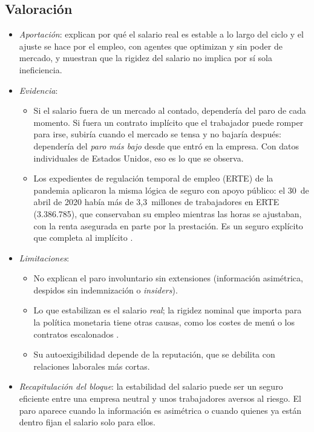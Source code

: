 \documentclass[11pt]{article}
\begin{document}
\subsection{Valoración}\label{sec:contratos-implicitos-valoracion}

\begin{itemize}
\item \emph{Aportación}: explican por qué el salario real es estable a lo largo del ciclo y el ajuste se hace por el empleo, con agentes que optimizan y sin poder de mercado, y muestran que la rigidez del salario no implica por sí sola ineficiencia.
\item \emph{Evidencia}:
  \begin{itemize}
  \item Si el salario fuera de un mercado al contado, dependería del paro de cada momento. Si fuera un contrato implícito que el trabajador puede romper para irse, subiría cuando el mercado se tensa y no bajaría después: dependería del \emph{paro más bajo} desde que entró en la empresa. Con datos individuales de Estados Unidos, eso es lo que se observa\nocite{BeaudryDiNardo1991Effect}.
  \item Los expedientes de regulación temporal de empleo (ERTE) de la pandemia aplicaron la misma lógica de seguro con apoyo público: el 30~de abril de 2020 había más de 3,3~millones de trabajadores en ERTE (3.386.785), que conservaban su empleo mientras las horas se ajustaban, con la renta asegurada en parte por la prestación\nocite{MISSM2020Afiliacion}. Es un seguro explícito que completa al implícito .
  \end{itemize}
\item \emph{Limitaciones}:
  \begin{itemize}
  \item No explican el paro involuntario sin extensiones (información asimétrica, despidos sin indemnización o \emph{insiders}).
  \item Lo que estabilizan es el salario \emph{real}; la rigidez nominal que importa para la política monetaria tiene otras causas, como los costes de menú o los contratos escalonados .
  \item Su autoexigibilidad depende de la reputación, que se debilita con relaciones laborales más cortas.
  \end{itemize}
\item \emph{Recapitulación del bloque}: la estabilidad del salario puede ser un seguro eficiente entre una empresa neutral y unos trabajadores aversos al riesgo. El paro aparece cuando la información es asimétrica o cuando quienes ya están dentro fijan el salario solo para ellos.
\end{itemize}
\end{document}
